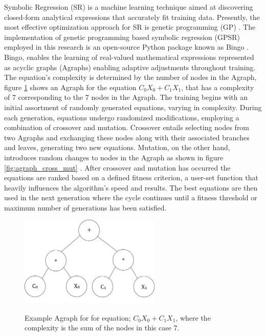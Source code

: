 Symbolic Regression (SR) is a machine learning technique aimed at discovering closed-form analytical expressions that accurately fit training data. Presently, the most effective optimization approach for SR is genetic programming (GP) \cite{GPSR-comp}. The implementation of genetic programming based symbolic regression (GPSR) employed in this research is an open-source Python package known as Bingo \cite{Randall2022}. Bingo, enables the learning of real-valued mathematical expressions represented as acyclic graphs (Agraphs) enabling adaptive adjustments throughout training. The equation's complexity is determined by the number of nodes in the Agraph, figure \ref{fig:agraph} shows an Agraph for the equation $C_0 X_0 + C_1 X_1$, that has a complexity of 7 corresponding to the 7 nodes in the Agraph. The training begins with an initial assortment of randomly generated equations, varying in complexity. During each generation, equations undergo randomized modifications, employing a combination of crossover and mutation. Crossover entails selecting nodes from two Agraphs and exchanging these nodes along with their associated branches and leaves, generating two new equations. Mutation, on the other hand, introduces random changes to nodes in the Agraph as shown in figure \ref{fig:agraph_cross_mut} \cite{Schmidt2007}. After crossover and mutation has occurred the equations are ranked based on a defined fitness criterion, a user-set function that heavily influences the algorithm's speed and results. The best equations are then used in the next generation where the cycle continues until a fitness threshold or maximum number of generations has been satisfied. 

\begin{figure}
    \centering
    \includegraphics[width=0.6\textwidth]{geometry_figures/agraph.png}
    \label{fig:agraph}
    \caption{Example Agraph for for equation; $C_0 X_0 + C_1 X_1$, where the complexity is the sum of the nodes in this case 7.} 
\end{figure}


